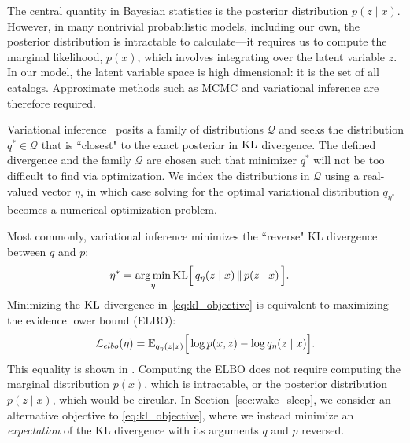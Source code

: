 The central quantity in Bayesian statistics is the posterior distribution $p(z\mid x)$.
However, in many
nontrivial probabilistic models, including our own, the posterior distribution is intractable to calculate---it requires us to compute the marginal likelihood, $p(x)$, which involves integrating over the latent variable $z$.
In our model, the latent variable space is high dimensional: it is the set of all catalogs. Approximate methods such as MCMC and variational inference are therefore required.

Variational inference~\citep{Jordan_intro_vi, Wainwrite_graph_models_vi, Blei_2017_vi_review} posits a family of distributions $\mathcal{Q}$ and seeks
the distribution $q^*\in \mathcal{Q}$ that is ``closest" to the exact posterior in $\textrm{KL}$ divergence.
The defined divergence and the family $\mathcal{Q}$ are chosen such that minimizer $q^*$ will
not be too difficult to find via optimization.
We index the distributions in $\mathcal{Q}$ using a real-valued vector $\eta$, in which
case solving for the optimal variational distribution $q_{\eta^*}$
becomes a numerical optimization problem.

%
Most commonly, variational inference minimizes the ``reverse" KL divergence
between $q$ and $p$:
\begin{align}
   \eta^* &= \operatorname*{arg\,min}_{\eta} \mathrm{KL}\Big[\,q_\eta(z \mid x)\, \| \,p(z \mid x)\,\Big].
   \label{eq:kl_objective}
\end{align}
Minimizing the $\textrm{KL}$ divergence in~\eqref{eq:kl_objective} is equivalent to maximizing the evidence lower bound (ELBO):
\begin{align}
    \mathcal{L}_{elbo}(\eta) =
    \mathbb{E}_{q_\eta(z \mid x)}\Big[\log p(x, z) - \log q_\eta(z \mid x)\Big].
    \label{eq:elbo}
\end{align}
This equality is shown in \cite{Blei_2017_vi_review}. Computing the ELBO does not require computing the marginal distribution $p(x)$, which is intractable, or the posterior distribution $p(z \mid x)$, which would be circular.
In Section~\ref{sec:wake_sleep}, we
consider an alternative objective to \eqref{eq:kl_objective},
where we instead minimize an \textit{expectation}
of the KL divergence with its arguments $q$ and $p$ reversed.


